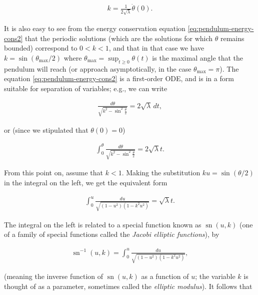 \documentclass[11pt]{report}
\theoremstyle{plain}
\theoremstyle{definition}
\begin{document}
\begin{align*}
k=\frac{1}{2\sqrt{\lambda}} \dot{\theta}(0).
\end{align*}

\noindent It is also easy to see from the energy conservation
equation \eqref{eq:pendulum-energy-cons2} that the
periodic solutions (which are the solutions for which
$\theta$ remains bounded) correspond to $0<k<1$, and
that in that case we have
$k=\sin (\theta_{\textrm{max}}/2)$ where
$\theta_{\textrm{max}}=\sup_{t\ge 0} \theta(t)$ is the
maximal angle that the pendulum will reach (or
approach asymptotically, in the case
$\theta_{\textrm{max}}=\pi$). The equation
\eqref{eq:pendulum-energy-cons2} is a first-order ODE, and
is in a form suitable for separation of variables;
e.g., we can write

\begin{align*}
\frac{d\theta}{\sqrt{k^2-\sin^2 \tfrac{\theta}{2}}} = 2\sqrt{\lambda} \,dt,
\end{align*}

\noindent or (since we stipulated that $\theta(0)=0$)

\begin{equation*} \tag{23}\label{eq:ellipticintegral-trig}
\begin{split}
\int_0^\theta \frac{d\theta}{\sqrt{k^2-\sin^2 \tfrac{\theta}{2}}} = 2\sqrt{\lambda} t.
\end{split}
\end{equation*}

\noindent From this point on, assume that $k<1$. Making the
substitution $ku = \sin(\theta/2)$ in the integral on
the left, we get the equivalent form

\begin{align*}
\int_0^u \frac{du}{\sqrt{(1-u^2)(1-k^2 u^2)}} = \sqrt{\lambda} t.
\end{align*}

\noindent The integral on the left is related to a special
function known as $\operatorname{sn}(u,k)$ (one of a
family of special functions called the \emph{Jacobi
elliptic functions}), by

\begin{align*}
\operatorname{sn}^{-1}(u,k) = \int_0^u \frac{du}{\sqrt{(1-u^2)(1-k^2 u^2)}},
\end{align*}

\noindent (meaning the inverse function of
$\operatorname{sn}(u,k)$ as a function of $u$; the
variable $k$ is thought of as a parameter, sometimes
called the \emph{elliptic modulus}). It follows that
\end{document}
